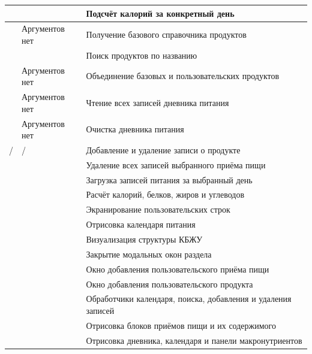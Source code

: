 \begin{xltabular}{\textwidth}{|P{4.4cm}|P{3.4cm}|X|}
	 &  & Подсчёт калорий за конкретный день \\ \hline
	 & Аргументов нет & Получение базового справочника продуктов \\ \hline
	 &  & Поиск продуктов по названию \\ \hline
	 & Аргументов нет & Объединение базовых и пользовательских продуктов \\ \hline
	 & Аргументов нет & Чтение всех записей дневника питания \\ \hline
	 & Аргументов нет & Очистка дневника питания \\ \hline
	 /  &  /  & Добавление и удаление записи о продукте \\ \hline
	 &  & Удаление всех записей выбранного приёма пищи \\ \hline
	 &  & Загрузка записей питания за выбранный день \\ \hline
	 &  & Расчёт калорий, белков, жиров и углеводов \\ \hline
	 &  & Экранирование пользовательских строк \\ \hline
	 &  & Отрисовка календаря питания \\ \hline
	 &  & Визуализация структуры КБЖУ \\ \hline
	 &  & Закрытие модальных окон раздела \\ \hline
	 &  & Окно добавления пользовательского приёма пищи \\ \hline
	 &  & Окно добавления пользовательского продукта \\ \hline
	 &  & Обработчики календаря, поиска, добавления и удаления записей \\ \hline
	 &  & Отрисовка блоков приёмов пищи и их содержимого \\ \hline
	 &  & Отрисовка дневника, календаря и панели макронутриентов \\ \hline
\end{xltabular}

